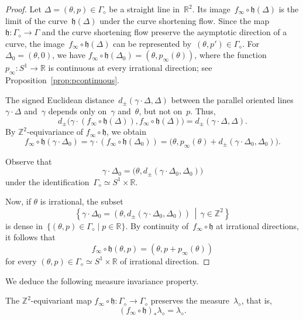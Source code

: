 \documentclass[AHL,Unicode,longabstracts,published]{cedram}
\newcommand{\Z}{\mathbb{Z}}
\newcommand{\R}{\mathbb{R}}
\newcommand{\bh}{\mathfrak{h}}
\begin{document}
\begin{proof}
Let $\Delta=(\theta,p) \in \Gamma_{\diamond}$ be a straight line in~$\R^2$. Its image~$f_\infty \circ \bh(\Delta)$ is the limit of the curve~$\bh(\Delta)$ under the curve shortening flow. Since the map $\bh:\Gamma_\diamond \to \Gamma$ and the curve shortening flow preserve the asymptotic direction of a curve, the image~$f_\infty \circ \bh(\Delta)$ can be represented by~$(\theta,p') \in \Gamma_\diamond$. For $\Delta_0=(\theta,0)$, we have $f_\infty \circ \bh(\Delta_0)=(\theta,p_\infty(\theta))$, where the function \mbox{$p_\infty:S^1 \to \R$} is continuous at every irrational direction; see Proposition~\ref{prop:pcontinuous}.


The signed Euclidean distance~$d_{\pm}(\gamma \cdot \Delta, \Delta)$ between the parallel oriented lines~$\gamma \cdot \Delta$ and~$\gamma$ depends only on~$\gamma$ and~$\theta$, but not on~$p$. Thus,
\[
d_{\pm}\big(\gamma \cdot (f_\infty \circ \bh(\Delta)),f_\infty \circ \bh(\Delta)\big) = d_{\pm}(\gamma \cdot \Delta,\Delta).
\]
By $\Z^2$-equivariance of $f_\infty \circ \bh$, we obtain
\[
f_\infty \circ \bh(\gamma \cdot \Delta_0) = \gamma \cdot (f_\infty \circ \bh(\Delta_0)) = \big(\theta,p_\infty(\theta)+d_{\pm}(\gamma \cdot \Delta_0,\Delta_0)\big).
\]

Observe that
\[
\gamma \cdot \Delta_0 = \big(\theta,d_{\pm}(\gamma \cdot \Delta_0,\Delta_0)\big)
\]
under the identification~$\Gamma_\diamond \simeq S^1 \times \R$.

Now, if $\theta$ is irrational, the subset
\[
\left\{ \gamma \cdot \Delta_0 = \left(\theta,d_{\pm}(\gamma \cdot \Delta_0,\Delta_0)\right) \,\middle|\, \gamma \in \Z^2 \right\}
\]
is dense in~$\{ (\theta,p) \in \Gamma_\diamond \mid p \in \R \}$. By continuity of~$f_\infty \circ \bh$ at irrational directions, it follows that
\[
f_\infty \circ \bh(\theta,p) = \left(\theta,p+p_\infty(\theta)\right)
\]
for every $(\theta,p) \in \Gamma_\diamond \simeq S^1 \times \R$ of irrational direction.
\end{proof}

We deduce the following measure invariance property.

\begin{prop}\label{prop:measure}
The $\Z^2$-equivariant map $f_\infty \circ \bh: \Gamma_\diamond \to \Gamma_\diamond$ preserves the measure~$\lambda_\diamond$, that is,
\[
(f_\infty \circ \bh)_* \lambda_\diamond = \lambda_\diamond.
\]
\end{prop}
\end{document}
